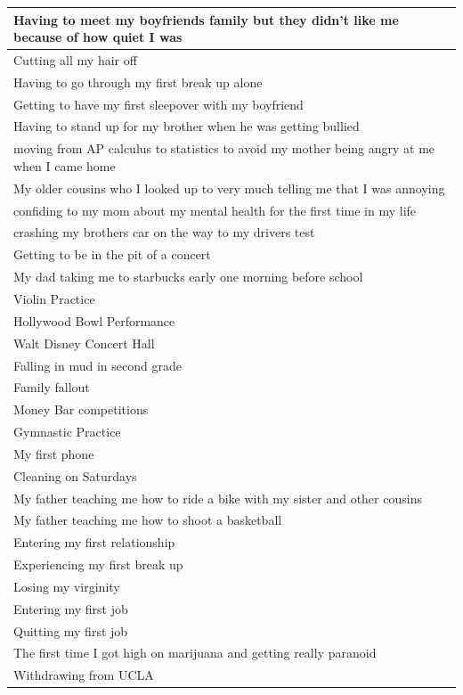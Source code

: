 \documentclass[
  .7em,
  letterpaper,
  DIV=11,
  numbers=noendperiod]{scrartcl}
\begin{document}
\begin{table}
\begin{tabular}{l}
\hline
Having to meet my boyfriends family but they didn't like me because of how quiet I was\\
\hline
Cutting all my hair off\\
\hline
Having to go through my first break up alone\\
\hline
Getting to have my first sleepover with my boyfriend\\
\hline
Having to stand up for my brother when he was getting bullied\\
\hline
moving from AP calculus to statistics to avoid my mother being angry at me when I came home\\
\hline
My older cousins who I looked up to very much telling me that I was annoying\\
\hline
confiding to my mom about my mental health for the first time in my life\\
\hline
crashing my brothers car on the way to my drivers test\\
\hline
Getting to be in the pit of a concert\\
\hline
My dad taking me to starbucks early one morning before school\\
\hline
Violin Practice\\
\hline
Hollywood Bowl Performance\\
\hline
Walt Disney Concert Hall\\
\hline
Falling in mud in second grade\\
\hline
Family fallout\\
\hline
Money Bar competitions\\
\hline
Gymnastic Practice\\
\hline
My first phone\\
\hline
Cleaning on Saturdays\\
\hline
My father teaching me how to ride a bike with my sister and other cousins\\
\hline
My father teaching me how to shoot a basketball\\
\hline
Entering my first relationship\\
\hline
Experiencing my first break up\\
\hline
Losing my virginity\\
\hline
Entering my first job\\
\hline
Quitting my first job\\
\hline
The first time I got high on marijuana and getting really paranoid\\
\hline
Withdrawing from UCLA\\

\end{tabular}
\end{table}
\end{document}
